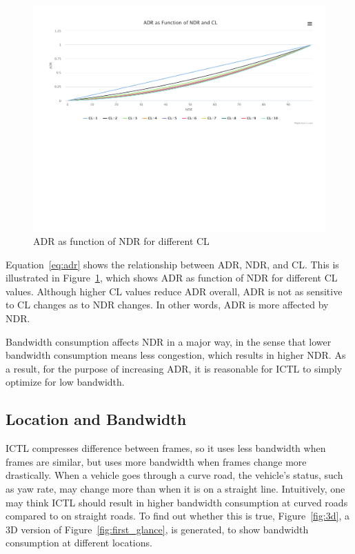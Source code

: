 \documentclass[12pt]{report}
\begin{document}
\begin{figure}[h]
  \begin{center}
    \includegraphics[width=\textwidth]{figures/adr.pdf}
    \caption{\label{fig:adr}ADR as function of NDR for different CL}
  \end{center}
\end{figure}

Equation~\ref{eq:adr} shows the relationship between ADR, NDR, and CL. This is illustrated in Figure~\ref{fig:adr}, which shows ADR as function of NDR for different CL values. Although higher CL values reduce ADR overall, ADR is not as sensitive to CL changes as to NDR changes. In other words, ADR is more affected by NDR.

Bandwidth consumption affects NDR in a major way, in the sense that lower bandwidth consumption means less congestion, which results in higher NDR. As a result, for the purpose of increasing ADR, it is reasonable for ICTL to simply optimize for low bandwidth.

\subsection{Location and Bandwidth}

ICTL compresses difference between frames, so it uses less bandwidth when frames are similar, but uses more bandwidth when frames change more drastically. When a vehicle goes through a curve road, the vehicle's status, such as yaw rate, may change more than  when it is on a straight line. Intuitively, one may think ICTL should result in higher bandwidth consumption at curved roads compared to on straight roads. To find out whether this is true, Figure~\ref{fig:3d}, a 3D version of Figure~\ref{fig:first_glance}, is generated, to show bandwidth consumption at different locations.
\end{document}
